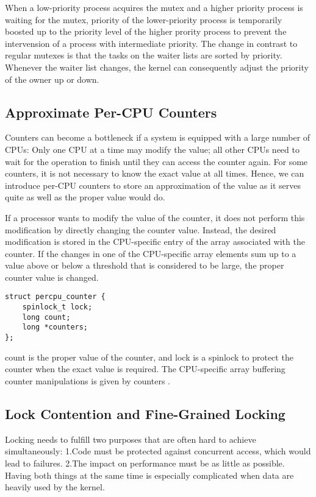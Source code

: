 \documentclass[a4paper]{article}
\begin{document}
When a low-priority process acquires the mutex and a higher priority process is waiting for the mutex, priority of the lower-priority process is temporarily boosted up to the priority level of the higher prority process to prevent the intervension of a process with intermediate priority. The change in contrast to regular mutexes is that the tasks on the waiter lists are sorted by priority. Whenever the waiter list changes, the kernel can consequently adjust the priority of the owner up or down.

\newpage

\subsection{Approximate Per-CPU Counters}

Counters can become a bottleneck if a system is equipped with a large number of CPUs: Only one CPU at
a time may modify the value; all other CPUs need to wait for the operation to finish until they can access
the counter again. For some counters, it is not necessary to know the exact value at all times. 
Hence, we can introduce per-CPU counters to store an approximation of the value as it serves quite as well as the proper value would do.

If a processor wants to modify the value of the counter, it does not perform this modification by directly changing the counter value. Instead, the desired modification is stored in the CPU-specific entry of the array associated with the counter. If the changes in one of the CPU-specific array elements sum up to a value above or below a threshold that is considered to be large, the proper counter value is changed.

\begin{verbatim}
struct percpu_counter {
	spinlock_t lock;
	long count;
	long *counters;
};
\end{verbatim}

count is the proper value of the counter, and lock is a spinlock to protect the counter when the exact
value is required. The CPU-specific array buffering counter manipulations is given by counters .

\subsection{Lock Contention and Fine-Grained Locking}

Locking needs to fulfill two purposes that are often hard to achieve simultaneously:
\newline
1.Code must be protected against concurrent access, which would lead to failures.
\newline
2.The impact on performance must be as little as possible.
\newline
Having both things at the same time is especially complicated when data are heavily used by the kernel.
\end{document}
